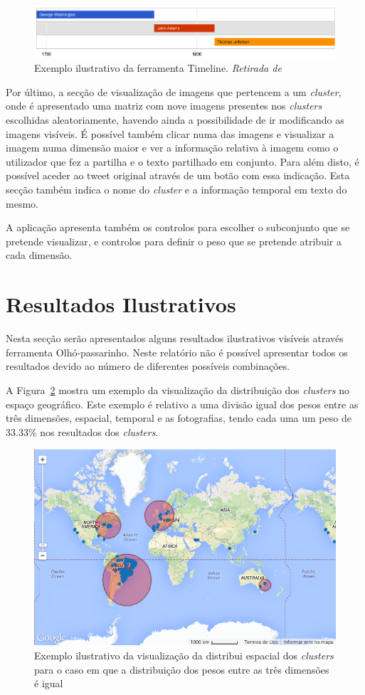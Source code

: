 \begin{figure}[h]
\centering
\includegraphics[width=1.0\linewidth]{./figures/olhopassarinho/time_example.png}
\caption{Exemplo ilustrativo da ferramenta Timeline. \textit{Retirada de}~\cite{googletimeline}}
\label{fig:timeex}
\end{figure}

Por último, a secção de visualização de imagens que pertencem a um \textit{cluster}, onde é apresentado uma matriz com nove imagens presentes nos \textit{clusters} escolhidas aleatoriamente, havendo ainda a possibilidade de ir modificando as imagens visíveis. É possível também clicar numa das imagens e visualizar a imagem numa dimensão maior e ver a informação relativa à imagem como o utilizador que fez a partilha e o texto partilhado em conjunto. Para além disto, é possível aceder ao tweet original através de um botão com essa indicação. Esta secção também indica o nome do \textit{cluster} e a informação temporal em texto do mesmo.

A aplicação apresenta também os controlos para escolher o subconjunto que se pretende visualizar, e controlos para definir o peso que se pretende atribuir a cada dimensão.

\section{Resultados Ilustrativos}

Nesta secção serão apresentados alguns resultados ilustrativos visíveis através ferramenta Olhó-passarinho. Neste relatório não é possível apresentar todos os resultados devido ao número de diferentes possíveis combinações. 

A Figura~\ref{fig:map3} mostra um exemplo da visualização da distribuição dos \textit{clusters} no espaço geográfico. Este exemplo é relativo a uma divisão igual dos pesos entre as três dimensões, espacial, temporal e as fotografias, tendo cada uma um peso de 33.33\% nos resultados dos \textit{clusters}.

\begin{figure}[h]
\centering
\includegraphics[width=0.6\linewidth]{./figures/olhopassarinho/map3}
\caption{Exemplo ilustrativo da visualização da distribui espacial dos \textit{clusters} para o caso em que a distribuição dos pesos entre as três dimensões é igual}
\label{fig:map3}
\end{figure}

